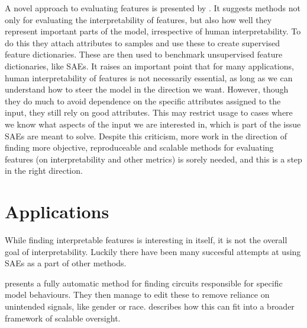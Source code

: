 A novel approach to evaluating features is presented by \cite{makelov_towards_2024}.
It suggests methods not only for evaluating the interpretability of features, but also how well they represent important parts of the model, irrespective of human interpretability.
To do this they attach attributes to samples and use these to create supervised feature dictionaries.
These are then used to benchmark unsupervised feature dictionaries, like SAEs.
It raises an important point that for many applications, human interpretability of features is not necessarily essential, as long as we can understand how to steer the model in the direction we want.
However, though they do much to avoid dependence on the specific attributes assigned to the input, they still rely on good attributes.
This may restrict usage to cases where we know what aspects of the input we are interested in, which is part of the issue SAEs are meant to solve.
Despite this criticism, more work in the direction of finding more objective, reproduceable and scalable methods for evaluating features (on interpretability and other metrics) is sorely needed, and this is a step in the right direction.







\section{Applications}
While finding interpretable features is interesting in itself, it is not the overall goal of interpretability.
Luckily there have been many succesful attempts at using SAEs as a part of other methods.

\cite{marks_sparse_2024} presents a fully automatic method for finding circuits \cite{elhage_mathematical_2021} responsible for specific model behaviours.
They then manage to edit these to remove reliance on unintended signals, like gender or race.
\cite{marks_discriminating_2024} describes how this can fit into a broader framework of scalable oversight.

